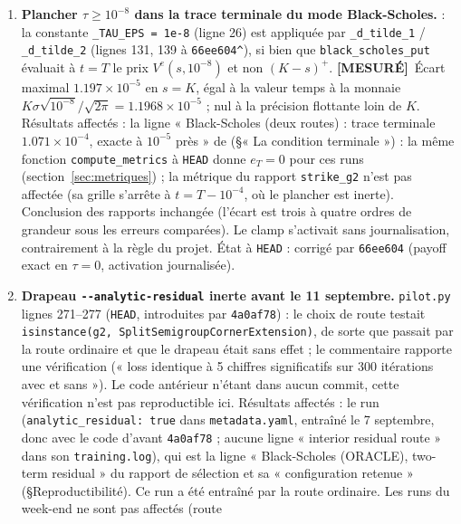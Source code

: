\documentclass[11pt]{article}
\newcommand{\mesure}{\textbf{[MESURÉ]}}
\newcommand{\code}[1]{\texttt{#1}}
\begin{document}
\begin{enumerate}
\item \textbf{Plancher $\tau\ge10^{-8}$ dans la trace terminale du mode
  Black-Scholes.}  : la
  constante \code{\_TAU\_EPS = 1e-8} (ligne 26) est appliquée par
  \code{\_d\_tilde\_1} / \code{\_d\_tilde\_2} (lignes 131, 139 à
  \code{66ee604\string^}), si bien que \code{black\_scholes\_put} évaluait à
  $t=T$ le prix $V^e(s,10^{-8})$ et non $(K-s)^+$. \mesure\ Écart maximal
  $1.197\times10^{-5}$ en $s=K$, égal à la valeur temps à la monnaie
  $K\sigma\sqrt{10^{-8}}/\sqrt{2\pi}=1.1968\times10^{-5}$ ; nul à la précision
  flottante loin de $K$. Résultats affectés : la ligne « Black-Scholes (deux
  routes) : trace terminale $1.071\times10^{-4}$, exacte à $10^{-5}$ près » de
  (\S« La condition terminale ») : la même fonction \code{compute\_metrics} à
  \code{HEAD} donne $e_T=0$ pour ces runs (section~\ref{sec:metriques}) ; la métrique du rapport \code{strike\_g2}
  n'est pas affectée (sa grille s'arrête à $t=T-10^{-4}$, où le plancher est
  inerte). Conclusion des rapports inchangée (l'écart est trois à quatre
  ordres de grandeur sous les erreurs comparées). Le clamp s'activait sans
  journalisation, contrairement à la règle du projet. État à \code{HEAD} :
  corrigé par \code{66ee604} (payoff exact en $\tau=0$, activation journalisée).
\item \textbf{Drapeau \code{-{}-analytic-residual} inerte avant le
  11 septembre.} \code{pilot.py} lignes 271--277 (\code{HEAD}, introduites par
  \code{4a0af78}) : le choix de route testait
  \code{isinstance(g2, SplitSemigroupCornerExtension)}, de sorte que
   passait par la route ordinaire et que le
  drapeau était sans effet ; le commentaire rapporte une vérification (« loss
  identique à 5 chiffres significatifs sur 300 itérations avec et sans »). Le
  code antérieur n'étant dans aucun commit, cette vérification n'est pas
  reproductible ici. Résultats affectés : le run
  (\code{analytic\_residual: true} dans \code{metadata.yaml}, entraîné le
  7 septembre, donc avec le code d'avant \code{4a0af78} ; aucune ligne
  « interior residual route » dans son \code{training.log}), qui est la ligne
  « Black-Scholes (ORACLE), two-term residual » du rapport de sélection et sa
  « configuration retenue » (\S Reproductibilité). Ce run a été entraîné par
  la route ordinaire. Les runs du week-end ne sont pas affectés (route

\end{enumerate}
\end{document}
